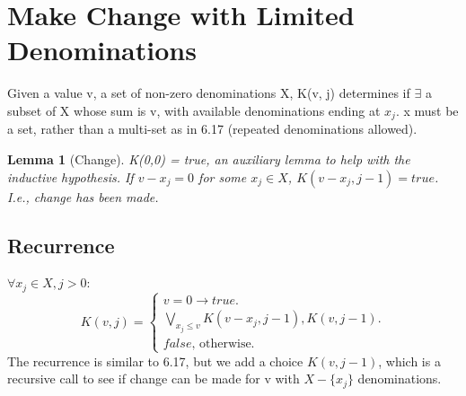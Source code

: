 \documentclass{article}
\newtheorem{lemma}[theorem]{Lemma}
\begin{document}
	
\section{Make Change with Limited Denominations}
Given a value v, a set of non-zero denominations X, K(v, j) determines if $\exists$ a subset of X whose sum is v, with available denominations ending at $x_j$. x must be a set, rather than a multi-set as in 6.17 (repeated denominations allowed).

\begin{lemma} [Change]
\label{bc1}	
K(0,0) = true, an auxiliary lemma to help with the inductive hypothesis.
If $v - x_j = 0$ for some $x_j \in X$, $K(v-x_j, j-1) = true$. I.e., change has been made.
\end{lemma}

\subsection{Recurrence}
$\forall x_j \in X, j>0$:\\
\begin{equation}
K(v,j)=			
\begin{cases}
v = 0 \to true.\\	
\underset{x_j \leq v}{\bigvee} K(v-x_j, j-1), K(v, j-1).\\
false \text{, otherwise.}
\end{cases}
\end{equation}
The recurrence is similar to 6.17, but we add a choice $K(v,j-1)$, which is a recursive call to see if change can be made for v with $X - \{x_j\}$ denominations.
\end{document}
